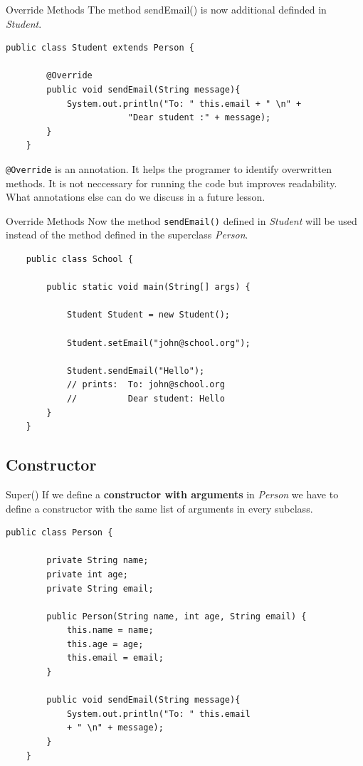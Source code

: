 \begin{frame}[fragile]{Override Methods}
	The method sendEmail() is now additional definded in \emph{Student}.
	\begin{lstlisting}[escapechar=!]
	public class Student extends Person {
	
	    @Override
	    public void sendEmail(String message){
	    	System.out.println("To: " this.email + " \n" +
	    				"Dear student :" + message);
    	}	
	}
	\end{lstlisting}
	\texttt{@Override} is an annotation. 
	It helps the programer to identify overwritten methods.
	It is not neccessary for running the code but improves readability.
	What annotations else can do we discuss in a future lesson.
\end{frame}
\begin{frame}[fragile]{Override Methods}
	Now the method \texttt{sendEmail()} defined in \emph{Student} will be used instead of the method defined
	in the superclass \emph{Person}.
	\begin{lstlisting}
	public class School {
	
	    public static void main(String[] args) {
	    
	        Student Student = new Student();
	        
	        Student.setEmail("john@school.org");
	        
	        Student.sendEmail("Hello");
	        // prints: 	To: john@school.org
	        //			Dear student: Hello
	    }	
	}
	\end{lstlisting}
\end{frame}

\subsection{Constructor}
\begin{frame}[fragile]{Super()}
	If we define a \textbf{constructor with arguments} in \emph{Person} we have to define a constructor
	with the same list of arguments in every subclass.
	\begin{lstlisting}[basicstyle=\ttfamily\scriptsize]
	public class Person {
	
	    private String name;
	    private int age;
	    private String email;
	    
	    public Person(String name, int age, String email) {
	        this.name = name;
	        this.age = age;
	        this.email = email;
	    }
	    	    
	    public void sendEmail(String message){
	    	System.out.println("To: " this.email 
	    	+ " \n" + message);
	    }
	}
	\end{lstlisting}
\end{frame}

